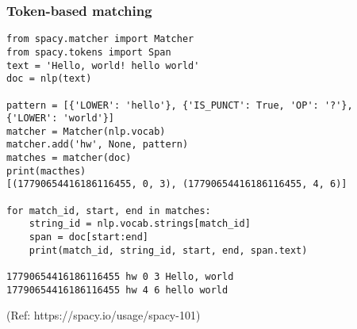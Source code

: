 \begin{frame}[fragile]\frametitle{Token-based matching }

\begin{lstlisting}
from spacy.matcher import Matcher
from spacy.tokens import Span
text = 'Hello, world! hello world'
doc = nlp(text)

pattern = [{'LOWER': 'hello'}, {'IS_PUNCT': True, 'OP': '?'}, {'LOWER': 'world'}]
matcher = Matcher(nlp.vocab)
matcher.add('hw', None, pattern)
matches = matcher(doc)
print(macthes)
[(17790654416186116455, 0, 3), (17790654416186116455, 4, 6)]

for match_id, start, end in matches:
    string_id = nlp.vocab.strings[match_id]
    span = doc[start:end]
    print(match_id, string_id, start, end, span.text)
		
17790654416186116455 hw 0 3 Hello, world
17790654416186116455 hw 4 6 hello world		
\end{lstlisting}
	
{\tiny (Ref: https://spacy.io/usage/spacy-101)}
\end{frame}